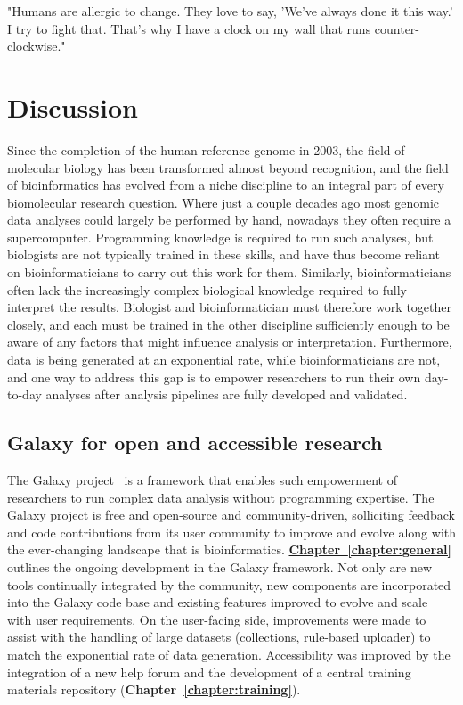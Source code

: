 \begin{savequote}[75mm]
"Humans are allergic to change. They love to say, 'We've always done it this way.' I try to fight that. That's why I have a clock on my wall that runs counter-clockwise."
\end{savequote}

\chapter{Discussion}
\label{discussion}
\setcounter{figure}{-1}
\setcounter{table}{-1}
\setcounter{section}{-1}
\setcounter{NAT@ctr}{-1}

Since the completion of the human reference genome in 2003, the field of molecular biology has been transformed almost beyond recognition, and the field of bioinformatics has evolved from a niche discipline to an integral part of every biomolecular research question. Where just a couple decades ago most genomic data analyses could largely be performed by hand, nowadays they often require a supercomputer. Programming knowledge is required to run such analyses, but biologists are not typically trained in these skills, and have thus become reliant on bioinformaticians to carry out this work for them. Similarly, bioinformaticians often lack the increasingly complex biological knowledge required to fully interpret the results. Biologist and bioinformatician must therefore work together closely, and each must be trained in the other discipline sufficiently enough to be aware of any factors that might influence analysis or interpretation. Furthermore, data is being generated at an exponential rate, while bioinformaticians are not, and one way to address this gap is to empower researchers to run their own day-to-day analyses after analysis pipelines are fully developed and validated.


\section{Galaxy for open and accessible research}
The Galaxy project~\cite{TODO} is a framework that enables such empowerment of researchers to run complex data analysis without programming expertise. The Galaxy project is free and open-source and community-driven, solliciting feedback and code contributions from its user community to improve and evolve along with the ever-changing landscape that is bioinformatics. \hyperref[chapter:galaxy]{\textbf{Chapter~\ref{chapter:general}}} outlines the ongoing development in the Galaxy framework. Not only are new tools continually integrated by the community, new components are incorporated into the Galaxy code base and existing features improved to evolve and scale with user requirements. On the user-facing side, improvements were made to assist with the handling of large datasets (collections, rule-based uploader) to match the exponential rate of data generation. Accessibility was improved by the integration of a new help forum and the development of a central training materials repository (\textbf{Chapter~\ref{chapter:training}}).


